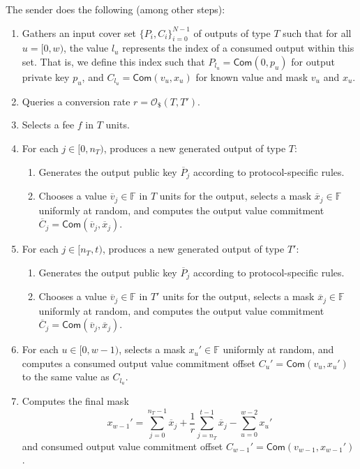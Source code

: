 \documentclass{article}
\newcommand{\F}{\mathbb{F}}
\newcommand{\func}[1]{\mathsf{#1}}
\newcommand{\com}{\func{Com}}
\newcommand{\oracle}{\mathcal{O}_{\$}}
\begin{document}
The sender does the following (among other steps):
\begin{enumerate}
    \item Gathers an input cover set $\{P_i,C_i\}_{i=0}^{N-1}$ of outputs of type $T$ such that for all $u = [0,w)$, the value $l_u$ represents the index of a consumed output within this set.
    That is, we define this index such that $P_{l_u} = \com(0,p_u)$ for output private key $p_u$, and $C_{l_u} = \com(v_u,x_u)$ for known value and mask $v_u$ and $x_u$.
    \item Queries a conversion rate $r = \oracle(T,T')$.
    \item Selects a fee $f$ in $T$ units.
    \item For each $j \in [0,n_T)$, produces a new generated output of type $T$:
    \begin{enumerate}
        \item Generates the output public key $\overline{P}_j$ according to protocol-specific rules.
        \item Chooses a value $\overline{v}_j \in \F$ in $T$ units for the output, selects a mask $\overline{x}_j \in \F$ uniformly at random, and computes the output value commitment $\overline{C}_j = \com(\overline{v}_j,\overline{x}_j)$.
    \end{enumerate}
    \item For each $j \in [n_T,t)$, produces a new generated output of type $T'$:
    \begin{enumerate}
        \item Generates the output public key $\overline{P}_j$ according to protocol-specific rules.
        \item Chooses a value $\overline{v}_j \in \F$ in $T'$ units for the output, selects a mask $\overline{x}_j \in \F$ uniformly at random, and computes the output value commitment $\overline{C}_j = \com(\overline{v}_j,\overline{x}_j)$.
    \end{enumerate}
    \item\label{step:conversion-prover-input-masks} For each $u \in [0,w-1)$, selects a mask $x_u' \in \F$ uniformly at random, and computes a consumed output value commitment offset $C_u' = \com(v_u,x_u')$ to the same value as $C_{l_u}$.
    \item\label{step:conversion-prover-last-mask} Computes the final mask $$x_{w-1}' = \sum_{j=0}^{n_T-1} \overline{x}_j + \frac{1}{r}\sum_{j=n_T}^{t-1} \overline{x}_j - \sum_{u=0}^{w-2} x_u'$$ and consumed output value commitment offset $C_{w-1}' = \com(v_{w-1},x_{w-1}')$.

\end{enumerate}
\end{document}
